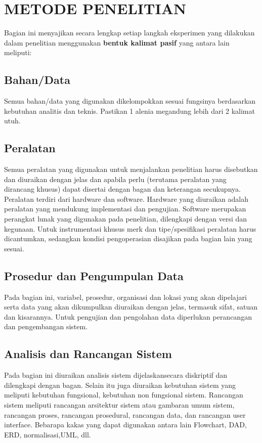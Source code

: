 
\chapter{METODE PENELITIAN}
Bagian ini menyajikan secara lengkap setiap langkah eksperimen yang dilakukan dalam penelitian menggunakan\textbf{ bentuk kalimat pasif} yang antara lain meliputi:

\section{Bahan/Data} 
Semua bahan/data yang digunakan dikelompokkan sesuai fungsinya berdasarkan kebutuhan analitis dan teknis. Pastikan 1 alenia megandung lebih dari 2 kalimat utuh.

\section{Peralatan} 
Semua peralatan yang digunakan untuk menjalankan penelitian harus disebutkan dan diuraikan dengan jelas dan apabila perlu (terutama peralatan yang dirancang khusus) dapat disertai dengan bagan dan keterangan secukupnya. Peralatan terdiri dari hardware dan software. Hardware yang diuraikan adalah peralatan yang mendukung implementasi dan pengujian. Software merupakan perangkat lunak yang digunakan pada penelitian, dilengkapi dengan versi dan kegunaan. Untuk instrumentasi khusus merk dan tipe/spesifikasi peralatan harus dicantumkan, sedangkan kondisi pengoperasian disajikan pada bagian lain yang sesuai.

\section{Prosedur dan Pengumpulan Data} 
Pada bagian ini, variabel, prosedur, organisasi dan lokasi yang akan dipelajari serta data yang akan dikumpulkan diuraikan dengan jelas, termasuk sifat, satuan dan kisarannya. Untuk pengujian dan pengolahan data diperlukan perancangan dan pengembangan sistem.

\section{Analisis dan Rancangan Sistem} 
Pada bagian ini diuraikan analisis sistem dijelaskansecara diskriptif dan dilengkapi dengan bagan. Selain itu juga diuraikan kebutuhan sistem yang meliputi kebutuhan fungsional, kebutuhan non fungsional sistem. Rancangan sistem meliputi rancangan arsitektur sistem atau gambaran umum sistem, rancangan proses, rancangan prosedural, rancangan data, dan rancangan user interface. Bebarapa kakas yang dapat digunakan antara lain Flowchart, DAD, ERD, normalisasi,UML, dll.

	
\begin{comment}

\end{comment}
